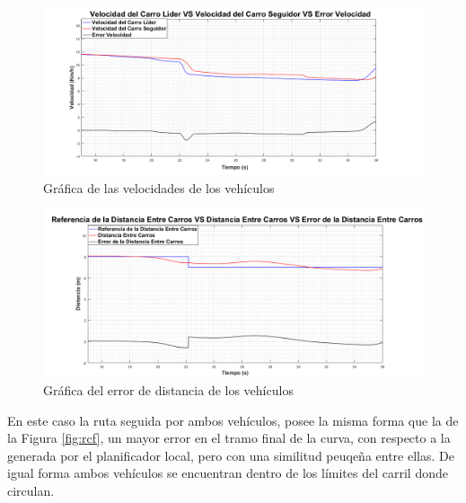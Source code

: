 \begin{figure}[H]
	\centering
		\includegraphics[scale=0.35]{Imagenes/vacf}
		\caption{Gráfica de las velocidades de los vehículos}
		\label{fig:aervel}
\end{figure}	

\begin{figure}[H]
	\centering
		\includegraphics[scale=0.35]{Imagenes/dacf}
		\caption{Gráfica del error de distancia de los vehículos}
		\label{fig:aerdist}
\end{figure}	

\par En este caso la ruta seguida por ambos vehículos, posee la misma forma que la de la Figura \ref{fig:rcf}, un mayor error en el tramo final de la curva, con respecto a la generada por el planificador local, pero con una similitud peuqeña entre ellas. De igual forma ambos vehículos se encuentran dentro de los límites del carril donde circulan.\\

